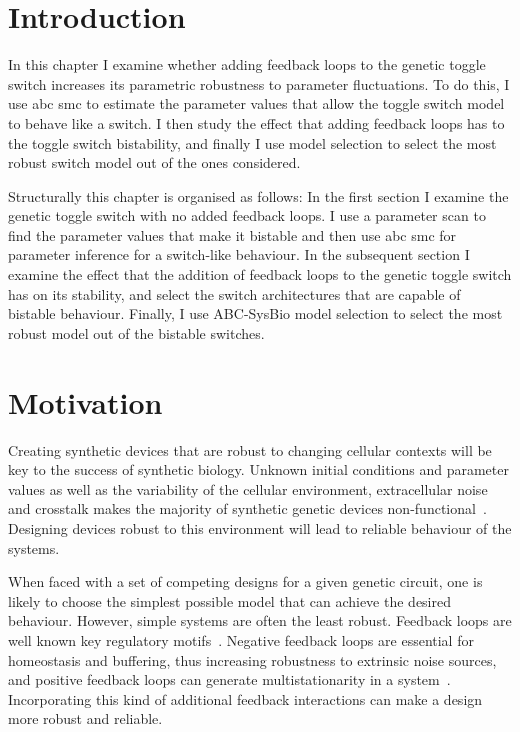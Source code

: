\section{Introduction}

In this chapter I examine whether adding feedback loops to the genetic toggle switch increases its parametric robustness to parameter fluctuations. To do this, I use \acrshort{abc} \acrshort{smc} to estimate the parameter values that allow the toggle switch model to behave like a switch.  I then study the effect that adding feedback loops has to the toggle switch bistability, and finally I use model selection to select the most robust switch model out of the ones considered.

Structurally this chapter is organised as follows: In the first section I examine the genetic toggle switch with no added feedback loops. I use a parameter scan to find the parameter values that make it bistable and then use \acrshort{abc} \acrshort{smc} for parameter inference for a switch-like behaviour. In the subsequent section I examine the effect that the addition of feedback loops to the genetic toggle switch has on its stability, and select the switch architectures that are capable of bistable behaviour. Finally, I use ABC-SysBio model selection to select the most robust model out of the bistable switches.


\section{Motivation}


Creating synthetic devices that are robust to changing cellular contexts will be key to the success of synthetic biology. Unknown initial conditions and parameter values as well as the variability of the cellular environment, extracellular noise and crosstalk makes the majority of synthetic genetic devices non-functional~\autocite{Chen:2009ea}. Designing devices robust to this environment will lead to reliable behaviour of the systems.

When faced with a set of competing designs for a given genetic circuit, one is likely to choose the simplest possible model that can achieve the desired behaviour. However, simple systems are often the least robust. Feedback loops are well known key regulatory motifs~\autocite{Brandman:2005ci}. Negative feedback loops are essential for homeostasis and buffering, thus increasing robustness to extrinsic noise sources, and positive feedback loops can generate multistationarity in a system~\autocite{Thomas:1995id}. Incorporating this kind of additional feedback interactions can make a design more robust and reliable. 


